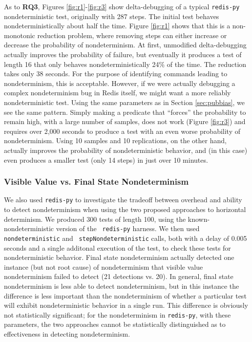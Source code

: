 As to {\bf RQ3}, Figures \ref{fig:r1}-\ref{fig:r3} show delta-debugging of a typical
{\tt redis-py} nondeterministic test, originally with 287 steps.  The initial test behaves
nondeterministically about half the time.  Figure \ref{fig:r1} shows
that this is a non-monotonic reduction problem, where removing steps
can either increase or decrease the probability of nondeterminism.  At
first, unmodified delta-debugging actually improves the probability of
failure, but eventually it produces a test of length 16 that only behaves
nondeterministically 24\% of the time.  The reduction takes only 38
seconds.  For the purpose of identifying commands leading to
nondeterminism, this is acceptable.  However, if we were actually
debugging a complex nondeterminism bug in Redis itself, we might want
a more reliably nondeterministic test.  Using the same parameters as
in Section \ref{sec:pubbias}, we see the same pattern.  Simply making
a predicate that ``forces'' the probability to remain high, with a
large number of samples, does not work (Figure \ref{fig:r3}) and
requires over 2,000 seconds to produce a test with an even worse
probability of nondeterminism.  Using 10 samples and 10 replications,
on the other hand, actually improves the probability of
nondeterministic behavior, and (in this case) even produces a smaller test (only 14 steps) in just
over 10 minutes.

\subsubsection{Visible Value vs. Final State Nondeterminism}

We also used {\tt redis-py} to investigate the tradeoff between
overhead and ability to detect nondeterminism when using the two
proposed approaches to horizontal determinism.  We produced 300 tests
of length 100, using the known-nondeterministic version of the {\tt
  redis-py} harness.  We then used {\tt nondeterministic} and {\tt
  stepNondeterministic} calls, both with a delay of 0.005 seconds and
a single additonal execution of the test, to
check these tests for nondeterministic behavior.  Final state
nondeterminism actually detected one instance (but not root cause) of nondeterminism that
visible value nondeterminism failed to detect (21 detections
vs. 20). In general, final state
nondeterminism is less able to detect nondeterminism, but in this
instance the difference is less important than the nondeterminism of
whether a particular test will exhibit nondeterministic behavior in a
single run.  This difference is obviously not statistically
significant; for the nondeterminism in {\tt redis-py}, with these
parameters, the two approaches cannot be statistically distinguished
as to effectiveness in detecting nondeterminism.

